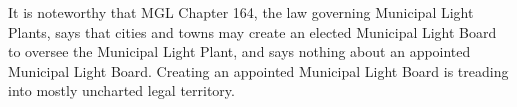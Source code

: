 \documentclass[12pt]{article}
\begin{document}
It is noteworthy that MGL Chapter 164\cite{MGL164}, the law governing
Municipal Light Plants, says that cities and towns may create an elected
Municipal Light Board to oversee the Municipal Light Plant, and says nothing
about an appointed Municipal Light Board. Creating an appointed Municipal
Light Board is treading into mostly uncharted legal territory.

\clearpage
{}


\end{document}
